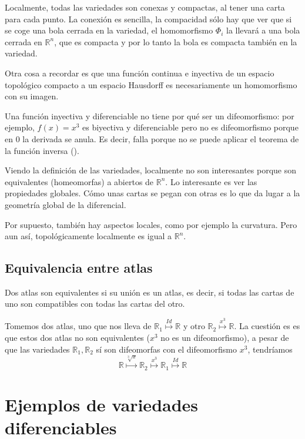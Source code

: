 Localmente, todas las variedades son conexas y compactas, al tener una carta para cada punto. La conexión es sencilla, la compacidad sólo hay que ver que si se coge una bola cerrada en la variedad, el homomorfismo $Φ_i$ la llevará a una bola cerrada en $ℝ^n$, que es compacta y por lo tanto la bola es compacta también en la variedad.

Otra cosa a recordar es que una función continua e inyectiva de un espacio topológico compacto a un espacio Hausdorff es necesariamente un homomorfismo con su imagen.

Una función inyectiva y diferenciable no tiene por qué ser un difeomorfismo: por ejemplo, $f(x) = x^3$ es biyectiva y diferenciable pero no es difeomorfismo porque en $0$ la derivada se anula. Es decir, falla porque no se puede aplicar el teorema de la función inversa ().

Viendo la definición de las variedades, localmente no son interesantes porque son equivalentes (homeomorfas) a abiertos de $ℝ^n$. Lo interesante es ver las propiedades globales. Cómo unas cartas se pegan con otras es lo que da lugar a la geometría global de la diferencial.

Por supuesto, también hay aspectos locales, como por ejemplo la curvatura. Pero aun así, topológicamente localmente es igual a $ℝ^n$.

\subsection{Equivalencia entre atlas}

\begin{defn}\label{def:AtlasEquiv} Dos atlas son equivalentes si su unión es un atlas, es decir, si todas las cartas de uno son compatibles con todas las cartas del otro.
\end{defn}

Tomemos dos atlas, uno que nos lleva de $ℝ_1 \overset{Id}{\longmapsto} ℝ$ y otro $ℝ_2 \overset{x^3}{\longmapsto} ℝ$. La cuestión es es que estos dos atlas no son equivalentes ($x^3$ no es un difeomorfismo), a pesar de que las variedades $ℝ_1, ℝ_2$ sí son difeomorfas con el difeomorfismo $x^3$, tendríamos \[ ℝ \overset{\sqrt[3]{x}}{\longmapsto} ℝ_2 \overset{x^3}{\longmapsto} ℝ_1 \overset{Id}{\longmapsto} ℝ \]



\section{Ejemplos de variedades diferenciables}


